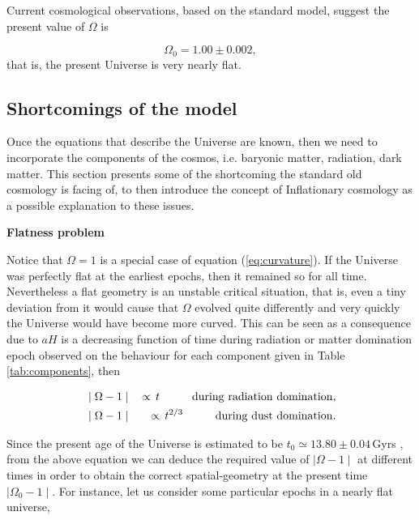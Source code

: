 \documentclass{rmaa}
\def\beq{\begin{equation}}
\def\eeq{\end{equation}}
\def\bea{\begin{eqnarray}}
\def\eea{\end{eqnarray}}
\begin{document}
   
\noindent
Current cosmological observations, based on the standard model, suggest the present value of 
$\Omega$ is \citep{McCoy}

\beq \label{eq:Omega}
\Omega_0=1.00\pm 0.002,
\eeq
%
that is, the present Universe is very nearly flat.
\\


\subsection{Shortcomings of the model}
Once the equations that describe the Universe are known, then we need to incorporate the
components of the cosmos, i.e. baryonic matter, radiation, dark matter. 
This section presents some of the shortcoming the standard old cosmology is facing of, to 
then introduce the concept of Inflationary cosmology as a possible explanation to these issues. 
\vskip 10pt

\textbf{Flatness problem}
\vskip 10pt


Notice that $\Omega=1$ is a special case of equation (\ref{eq:curvature}). 
If the Universe was 
perfectly flat at the earliest epochs,  then it remained so for all time. 
Nevertheless a flat geometry is an unstable
critical situation, that is, even a tiny deviation from it would cause that $\Omega$ evolved 
quite differently and very quickly the Universe would have become more curved. 
This can be seen as a consequence due to $aH$ is a decreasing function of time 
during radiation or matter domination epoch observed on 
 the behaviour for each component given in Table \ref{tab:components}, then
%

\bea
&\mid \Omega-1\mid & \, \propto \, t  \hspace{1cm} {\rm during\,\,radiation\,\, domination},\nonumber \\ 
&\mid \Omega-1\mid & \, \propto \, t^{2/3}  \hspace{1cm} {\rm during\,\,dust\,\, domination}. \nonumber
\eea

\noindent
Since the present age of the Universe is estimated to be $t_0 \simeq 13.80\pm0.04 
\, $Gyrs \citep{Apar}, from the above equation we can 
deduce the required value of $\mid \Omega-1\mid$ at different times in order to 
obtain the correct spatial-geometry at the present time $\mid \Omega_0-1\mid$. For instance, let us consider some 
particular epochs in a nearly flat universe,
\end{document}

